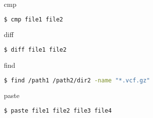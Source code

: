 \documentclass{beamer}
\begin{document}
\begin{frame}[fragile]
 \begin{center}
    \huge{cmp}\\
    \end{center}
\begin{lstlisting}[language=bash]
$ cmp file1 file2
\end{lstlisting}
\end{frame}

\begin{frame}[fragile]
 \begin{center}
    \huge{diff}\\
    \end{center}
\begin{lstlisting}[language=bash]
$ diff file1 file2
\end{lstlisting}
\end{frame}

\begin{frame}[fragile]
 \begin{center}
    \huge{find}\\
    \end{center}
\begin{lstlisting}[language=bash]
$ find /path1 /path2/dir2 -name "*.vcf.gz"
\end{lstlisting}
\end{frame}

\begin{frame}[fragile]
 \begin{center}
    \huge{paste}\\
    \end{center}
\begin{lstlisting}[language=bash]
$ paste file1 file2 file3 file4
\end{lstlisting}
\end{frame}
\end{document}
